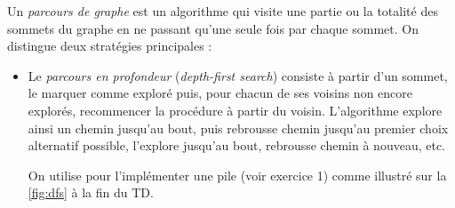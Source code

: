 \documentclass{article}
\begin{document}
Un \emph{parcours de graphe} est un algorithme qui visite une partie ou la totalité des sommets du graphe en ne passant qu'une seule fois par chaque sommet. On distingue deux stratégies principales :
\begin{itemize}
	\item Le \emph{parcours en profondeur} (\textit{depth-first search}) consiste à partir d'un sommet, le marquer comme exploré puis, pour chacun de ses voisins non encore explorés, recommencer la procédure à partir du voisin. L'algorithme explore ainsi un chemin jusqu'au bout, puis rebrousse chemin jusqu'au premier choix alternatif possible, l'explore jusqu'au bout, rebrousse chemin à nouveau, etc.
	
	On utilise pour l'implémenter une pile (voir exercice 1) comme illustré sur la \autoref{fig:dfs} à la fin du TD.
	

\end{itemize}
\end{document}
